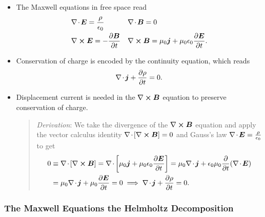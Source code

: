 \documentclass[11pt, a4paper]{article}
\renewcommand{\vec}[1]{\bm{#1}} %
\newcommand{\E}{\vec{E}} %
\newcommand{\B}{\vec{B}} %
\newcommand{\ee}{\epsilon_{0}}  %
\newcommand{\mm}{\mu_{0}}  %
\renewcommand{\j}{\vec{j}}  %
\renewcommand{\div}{\nabla \mspace{-2mu} \cdot \mspace{-2mu}}
\renewcommand{\curl}{\nabla \cross}
\begin{document}
\begin{itemize}
    \item The Maxwell equations in free space read 
        \begin{align*}
            & \div \E = \frac{\rho}{\ee} && \div \B = 0\\
            & \curl \E = - \pdv{\B}{t} && \curl \B = \mm \j + \mm \ee \pdv{\E}{t}.
        \end{align*}

    \item Conservation of charge is encoded by the continuity equation, which reads
    \begin{equation*}
        \div \j + \pdv{\rho}{t} = 0.
    \end{equation*}

    \item Displacement current is needed in the $ \curl \B $ equation to preserve conservation of charge.

    \begin{quote}
        \textit{Derivation}: We take the divergence of the $ \curl \B $ equation and apply the vector calculus identity $ \div [\curl \B ] = 0 $ and Gauss's law $ \div \E = \frac{\rho}{\ee} $ to get
        \begin{align*}
            0 & \equiv \div [ \curl \B ] = \div \left[ \mm \j + \mm \ee \pdv{\E}{t} \right] = \mm \div \j + \ee \mm \pdv{t} (\div \E) \\
            & = \mm \div \j + \mm \pdv{\E}{t} = 0 \implies \div \j + \pdv{\rho}{t} = 0.
        \end{align*}
    \end{quote}
    
\end{itemize}

\subsubsection{The Maxwell Equations the Helmholtz Decomposition}
\end{document}
